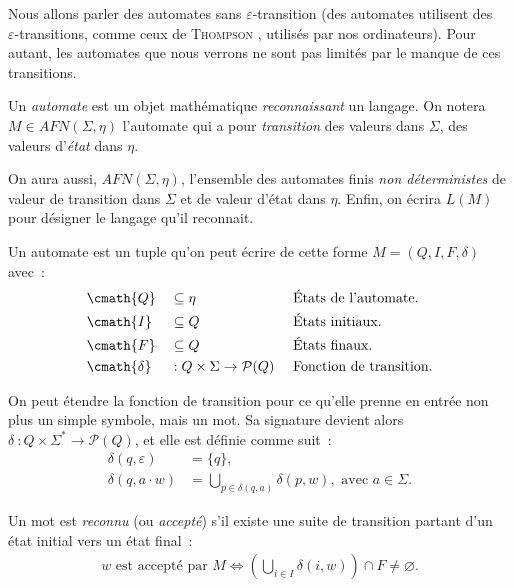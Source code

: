 Nous allons parler des automates sans \(\varepsilon\)-transition (des 
automates utilisent des \\\(\varepsilon\)-transitions, comme ceux de 
\textsc{Thompson} \cite{thompson1968programming}, utilisés par nos 
ordinateurs). Pour autant, les automates que nous verrons ne sont pas limités
par le manque de ces transitions.

\begin{definition}[Automate]
  Un \textit{automate} est un objet mathématique \textit{reconnaissant} un
  langage. On notera \(M \in AFN(\Sigma, \eta)\) l'automate qui a pour
  \textit{transition} des valeurs dans \(\Sigma\), des valeurs d'\textit{état}
  dans \(\eta\).

  \vphantom{}

  On aura aussi, \(AFN(\Sigma, \eta)\), l'ensemble des automates finis 
  \textit{non déterministes} de valeur de transition dans \(\Sigma\) et de 
  valeur d'état dans \(\eta\). Enfin, on écrira \(L(M)\) pour désigner le
  langage qu'il reconnait.

  \vphantom{}

  Un automate est un tuple qu'on peut écrire de cette forme \(M = (Q, I, F, 
  \delta)\) avec~:
  \begin{alignat*}{3}
    &\cmath{Q} && \subseteq \eta &&\text{États de l'automate.} \\
    &\cmath{I} && \subseteq Q &&\text{États initiaux.} \\
    &\cmath{F} && \subseteq Q &&\text{États finaux.} \\
    &\cmath{\delta}&&: Q \times \Sigma \to \mathcal{P}(Q)~ &&\text{Fonction de
    transition.}
  \end{alignat*}
\end{definition}

\begin{remark}
  On peut étendre la fonction de transition pour ce qu’elle prenne en entrée
  non plus un simple symbole, mais un mot. Sa signature devient alors 
  \(\delta~: Q \times \Sigma^* \to \mathcal{P}(Q)\), et elle est définie comme
  suit~:
  \begin{align*}
    \delta(q, \varepsilon) &= \{q\}, \\
    \delta(q, a \cdot w) &= \bigcup_{p \in \delta(q, a)} \delta(p, w),
    \text{ avec } a \in \Sigma.
  \end{align*}
\end{remark}

\begin{definition}
  Un mot est \textit{reconnu} (ou \textit{accepté}) s'il existe une suite de
  transition partant d'un état initial vers un état final~:
  \begin{align*}
    w \text{ est accepté par } M \Longleftrightarrow \left( \bigcup_{i \in I}
    \delta(i, w) \right) \cap F \neq \varnothing.
  \end{align*}
\end{definition}

